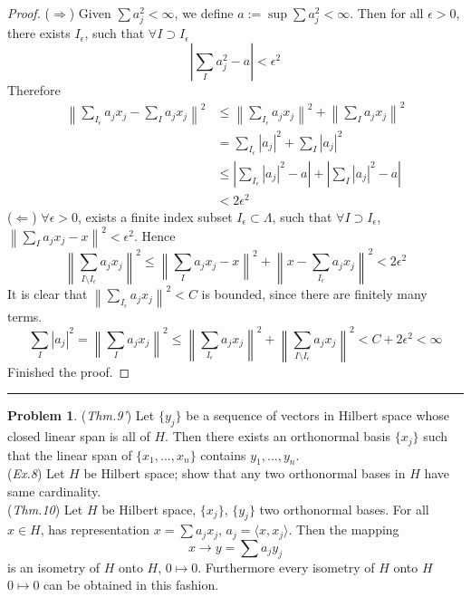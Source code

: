 \documentclass[a4paper, 10pt]{article}
\theoremstyle{definition}
\newtheorem{problem}{Problem}
\theoremstyle{hSol}
\begin{document}
\begin{proof} ($\Rightarrow$) Given $\sum a_j^2 < \infty$, we define $a:=\sup \sum a_j^2 < \infty$. Then for all $\epsilon >0$, there exists $I_{\epsilon}$, such that $\forall I \supset I_{\epsilon}$
$$\left|\sum_I a_j^2-a\right|<\epsilon^2$$
Therefore
\begin{equation}
	\begin{split}
		\left\|\sum_{I_{\epsilon}}a_jx_j-\sum_{I}a_jx_j\right\|^2 &\leq \left\|\sum_{I_{\epsilon}}a_jx_j\right\|^2 + \left\|\sum_{I}a_jx_j\right\|^2 \\
		&= \sum_{I_{\epsilon}}|a_j|^2 + \sum_{I}|a_j|^2 \\
		&\leq \left|\sum_{I_{\epsilon}}|a_j|^2-a\right| + \left|\sum_{I}|a_j|^2-a\right| \\
		& < 2 \epsilon^2
	\end{split}
\end{equation}
($\Leftarrow$) $\forall \epsilon >0$, exists a finite index subset $I_{\epsilon} \subset \Lambda$, such that $\forall I \supset I_{\epsilon}$, $\left\|\sum_I a_j x_j - x\right\|^2 < \epsilon^2$. Hence
\begin{equation}
	\left\|\sum_{I\setminus I_{\epsilon}} a_j x_j\right\|^2 \leq \left\|\sum_{I} a_j x_j-x\right\|^2 + \left\|x-\sum_{I_{\epsilon}} a_j x_j\right\|^2 < 2 \epsilon^2
\end{equation}
It is clear that $\left\|\sum_{I_{\epsilon}}a_jx_j\right\|^2<C$ is bounded, since there are finitely many terms.
\begin{equation}
	\sum_{I}|a_j|^2 = \left\|\sum_{I}a_jx_j\right\|^2 \leq \left\|\sum_{I_{\epsilon}}a_jx_j\right\|^2 + \left\|\sum_{I \setminus I_{\epsilon}}a_jx_j\right\|^2 < C + 2 \epsilon^2 < \infty
\end{equation}
Finished the proof.
\end{proof}

\noindent\rule{16cm}{0.4pt}
\begin{problem} (\textit{Thm.9'}) Let $\{y_j\}$ be a sequence of vectors in Hilbert space whose closed linear span is all of $H$. Then there exists an orthonormal basis $\{x_j\}$ such that the linear span of $\{x_1, ..., x_n\}$ contains $y_1, ..., y_n$. \\
(\textit{Ex.8}) Let $H$ be Hilbert space; show that any two orthonormal bases in $H$ have same cardinality. \\
(\textit{Thm.10}) Let $H$ be Hilbert space, $\{x_j\}$, $\{y_j\}$ two orthonormal bases. For all $x\in H$, has representation $x=\sum a_jx_j$, $a_j = \langle x,x_j \rangle$. Then the mapping
$$x\to y = \sum a_j y_j$$
is an isometry of $H$ onto $H$, $0 \mapsto 0$. Furthermore every isometry of $H$ onto $H$ $0\mapsto 0$ can be obtained in this fashion.
\end{problem}
\end{document}
